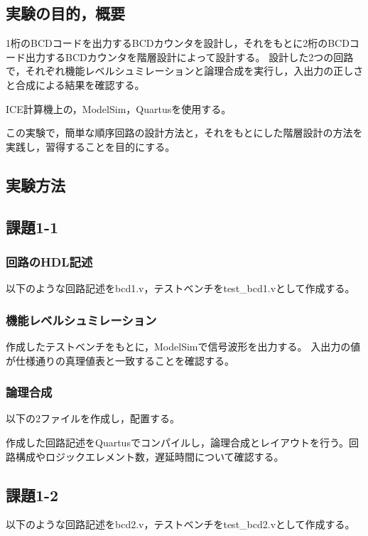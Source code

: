 
\subsection{実験の目的，概要}
1桁のBCDコードを出力するBCDカウンタを設計し，それをもとに2桁のBCDコード出力するBCDカウンタを階層設計によって設計する。
設計した2つの回路で，それぞれ機能レベルシュミレーションと論理合成を実行し，入出力の正しさと合成による結果を確認する。

ICE計算機上の，ModelSim，Quartusを使用する。

この実験で，簡単な順序回路の設計方法と，それをもとにした階層設計の方法を実践し，習得することを目的にする。

\subsection{実験方法}
\subsection*{課題1-1}
\subsubsection{回路のHDL記述}
以下のような回路記述をbcd1.v，テストベンチをtest\_bcd1.vとして作成する。



\subsubsection{機能レベルシュミレーション}
作成したテストベンチをもとに，ModelSimで信号波形を出力する。
入出力の値が仕様通りの真理値表と一致することを確認する。

\subsubsection{論理合成}
以下の2ファイルを作成し，配置する。



作成した回路記述をQuartusでコンパイルし，論理合成とレイアウトを行う。回路構成やロジックエレメント数，遅延時間について確認する。

\subsection*{課題1-2}
以下のような回路記述をbcd2.v，テストベンチをtest\_bcd2.vとして作成する。



